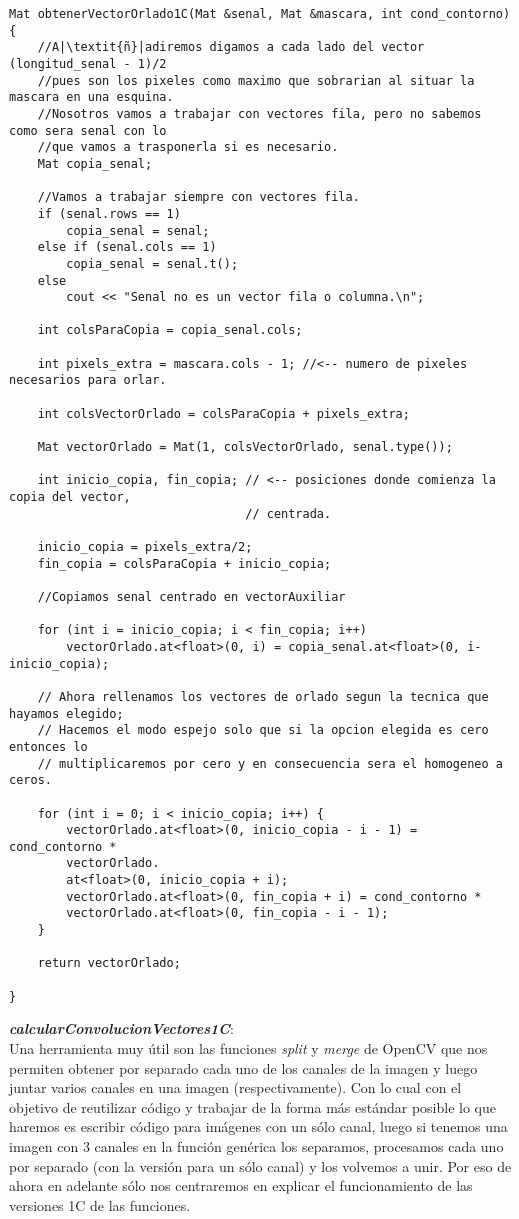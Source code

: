 \documentclass[10pt,a4paper]{article}
\begin{document}
\begin{lstlisting}
Mat obtenerVectorOrlado1C(Mat &senal, Mat &mascara, int cond_contorno) {
	//A|\textit{ñ}|adiremos digamos a cada lado del vector (longitud_senal - 1)/2
	//pues son los pixeles como maximo que sobrarian al situar la mascara en una esquina.
	//Nosotros vamos a trabajar con vectores fila, pero no sabemos como sera senal con lo
	//que vamos a trasponerla si es necesario.
	Mat copia_senal;

	//Vamos a trabajar siempre con vectores fila.
	if (senal.rows == 1)
		copia_senal = senal;
	else if (senal.cols == 1)
		copia_senal = senal.t();
	else
		cout << "Senal no es un vector fila o columna.\n";

	int colsParaCopia = copia_senal.cols;	
	
	int pixels_extra = mascara.cols - 1; //<-- numero de pixeles necesarios para orlar.

	int colsVectorOrlado = colsParaCopia + pixels_extra;

	Mat vectorOrlado = Mat(1, colsVectorOrlado, senal.type());

	int inicio_copia, fin_copia; // <-- posiciones donde comienza la copia del vector,
	                             // centrada.

	inicio_copia = pixels_extra/2;
	fin_copia = colsParaCopia + inicio_copia;

	//Copiamos senal centrado en vectorAuxiliar

	for (int i = inicio_copia; i < fin_copia; i++)
		vectorOrlado.at<float>(0, i) = copia_senal.at<float>(0, i-inicio_copia);		
	
	// Ahora rellenamos los vectores de orlado segun la tecnica que hayamos elegido;
	// Hacemos el modo espejo solo que si la opcion elegida es cero entonces lo
	// multiplicaremos por cero y en consecuencia sera el homogeneo a ceros.
	
	for (int i = 0; i < inicio_copia; i++) {
		vectorOrlado.at<float>(0, inicio_copia - i - 1) = cond_contorno *
		vectorOrlado.
		at<float>(0, inicio_copia + i);
		vectorOrlado.at<float>(0, fin_copia + i) = cond_contorno * 
		vectorOrlado.at<float>(0, fin_copia - i - 1);
	}

	return vectorOrlado;

}
\end{lstlisting}

\textbf{\textit{calcularConvolucionVectores1C}}:\\

Una herramienta muy útil son las funciones \textit{split} y \textit{merge} de OpenCV que nos permiten obtener por separado cada uno de los canales de la imagen y luego juntar varios canales en una imagen (respectivamente). Con lo cual con el objetivo de reutilizar código y trabajar de la forma más estándar posible lo que haremos es escribir código para imágenes con un sólo canal, luego si tenemos una imagen con 3 canales en la función genérica los separamos, procesamos cada uno por separado (con la versión para un sólo canal) y los volvemos a unir. Por eso de ahora en adelante sólo nos centraremos en explicar el funcionamiento de las versiones 1C de las funciones.\\
\end{document}
